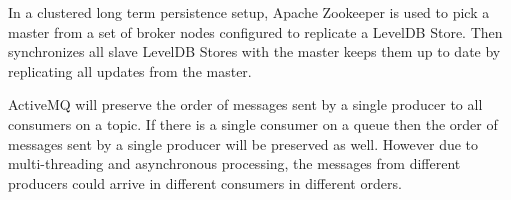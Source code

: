 \begin{description}
{    In a clustered long term persistence setup, Apache Zookeeper
    is used to pick a master from a set of broker nodes configured to replicate
    a LevelDB Store. Then synchronizes all slave LevelDB Stores with the master
    keeps them up to date by replicating all updates from the master. 

    ActiveMQ will preserve the order of messages sent by a single producer to
    all consumers on a topic. If there is a single consumer on a queue then the
    order of messages sent by a single producer will be preserved as well.
    However due to multi-threading and asynchronous processing, the messages
    from different producers could arrive in different consumers in different
    orders. 
    \cite{activemq}
    }
\end{description}


